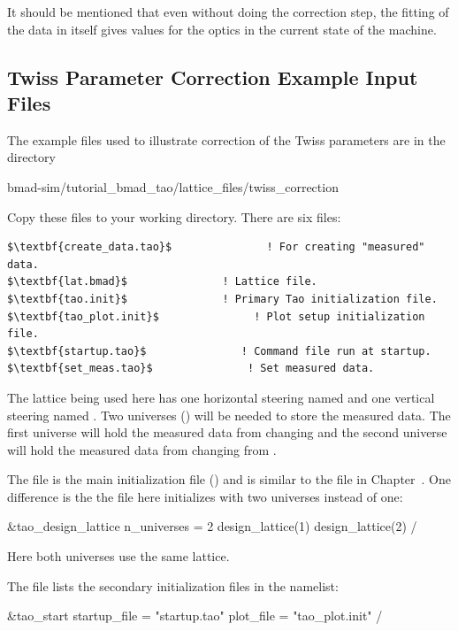 \documentclass{hitec}     %
\begin{document}
{It should be mentioned that even without doing the correction step, the fitting of the data in 
itself gives values for the optics in the current state of the machine.

\subsection{Twiss Parameter Correction Example Input Files}
\label{s:twiss.setup}

The example files used to illustrate correction of the Twiss parameters are in the directory 
\begin{code}
bmad-sim/tutorial_bmad_tao/lattice_files/twiss_correction
\end{code}
Copy these files to your working directory. There are six files:
\begin{lstlisting}[mathescape]
$\textbf{create_data.tao}$               ! For creating "measured" data. 
$\textbf{lat.bmad}$               ! Lattice file.
$\textbf{tao.init}$               ! Primary Tao initialization file.
$\textbf{tao_plot.init}$               ! Plot setup initialization file.
$\textbf{startup.tao}$               ! Command file run at startup.
$\textbf{set_meas.tao}$               ! Set measured data.
\end{lstlisting}

The lattice being used here has one horizontal steering named  and one vertical steering
named . Two universes () will be needed to store the measured
data. The first universe will hold the measured data from changing  and the second universe
will hold the measured data from changing from .

The file  is the main initialization file () and is similar to the
 file in Chapter~. One difference is the the  file here
initializes \tao with two universes instead of one:
\begin{code}
&tao_design_lattice
  n_universes = 2
  design_lattice(1)%
  design_lattice(2)%
/
\end{code}
Here both universes use the same lattice.

The  file lists the secondary initialization files in the  namelist:
\begin{code}
&tao_start
  startup_file = "startup.tao"
  plot_file = "tao_plot.init"
/
\end{code}

}
\end{document}
